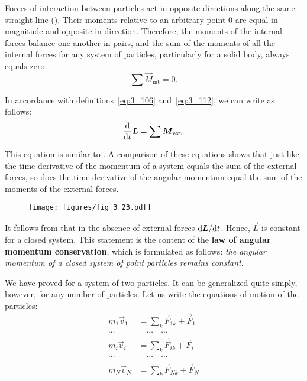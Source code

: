 Forces of interaction between particles act in opposite directions along the same straight line (). Their moments relative to an arbitrary point $0$ are equal in magnitude and opposite in direction. Therefore, the moments of the internal forces balance one another in pairs, and the sum of the moments of all the internal forces for any system of particles, particularly for a solid body, always equals zero:
\begin{equation}\label{eq:3_117}
\sum\vec{M}_{\text{int}} = 0.
\end{equation}

In accordance with definitions~\eqref{eq:3_106} and~\eqref{eq:3_112}, we can write  as follows:
\begin{equation}\label{eq:3_118}
\frac{\mathrm{d}}{\mathrm{d} t}\boldsymbol{L} = \sum\boldsymbol{M}_{\text{ext}}.
\end{equation}

\noindent
This equation is similar to . A comparison of these equations shows that just like the time derivative of the momentum of a system equals the sum of the external forces, so does the time derivative of the angular momentum equal the sum of the moments of the external forces.

\begin{figure}[t]
	\begin{center}
		\texttt{[image: figures/fig\_3\_23.pdf]}
		\caption[]{}
		\label{fig:3_23}
	\end{center}
	\vspace{-0.9cm}
\end{figure}

It follows from  that in the absence of external forces $\mathrm{d}\boldsymbol{L}/\mathrm{d} t$. Hence, $\vec{L}$ is constant for a closed system. This statement is the content of the \textbf{law of angular momentum conservation}, which is formulated as follows: \textit{the angular momentum of a closed system of point particles remains constant}.

We have proved  for a system of two particles. It can be generalized quite simply, however, for any number of particles. Let us write the equations of motion of the particles:
\begin{align*}
m_1\dot{\vec{v}}_1 &= \sum_k \vec{F}_{1k} + \vec{F}_1\\
\cdots & \quad\cdots \quad\cdots\\
m_i\dot{\vec{v}}_i &= \sum_k \vec{F}_{ik} + \vec{F}_i\\
\cdots & \quad\cdots \quad\cdots\\
m_N\dot{\vec{v}}_N &= \sum_k \vec{F}_{Nk} + \vec{F}_N
\end{align*}

